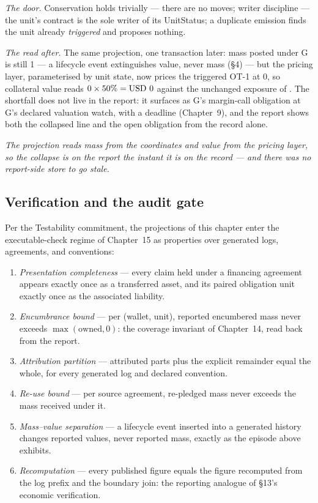 \emph{The door.} Conservation holds trivially --- there are no moves; writer
discipline --- the unit's contract is the sole writer of its UnitStatus; a
duplicate emission finds the unit already \emph{triggered} and proposes
nothing.

\emph{The read after.} The same projection, one transaction later: mass posted
under G is still 1 --- a lifecycle event extinguishes value, never mass
(\S 4) --- but the pricing layer, parameterised by unit state, now prices the
triggered OT-1 at 0, so collateral value reads $0 \times 50\% = \mbox{USD~0}$
against the unchanged exposure of . The shortfall does not live
in the report: it surfaces as G's margin-call obligation at G's declared
valuation watch, with a deadline (Chapter~9), and the report shows both the
collapsed line and the open obligation from the record alone.

\emph{The projection reads mass from the coordinates and value from the pricing
layer, so the collapse is on the report the instant it is on the record --- and
there was no report-side store to go stale.}

\subsection{Verification and the audit gate}

Per the Testability commitment, the projections of this chapter enter the
executable-check regime of Chapter~15 as properties over generated logs,
agreements, and conventions:

\begin{enumerate}[nosep]
\item \emph{Presentation completeness} --- every claim held under a financing
  agreement appears exactly once as a transferred asset, and its paired
  obligation unit exactly once as the associated liability.
\item \emph{Encumbrance bound} --- per (wallet, unit), reported encumbered mass
  never exceeds $\max(\text{owned}, 0)$: the coverage invariant of Chapter~14,
  read back from the report.
\item \emph{Attribution partition} --- attributed parts plus the explicit
  remainder equal the whole, for every generated log and declared convention.
\item \emph{Re-use bound} --- per source agreement, re-pledged mass never
  exceeds the mass received under it.
\item \emph{Mass--value separation} --- a lifecycle event inserted into a
  generated history changes reported values, never reported mass, exactly as
  the episode above exhibits.
\item \emph{Recomputation} --- every published figure equals the figure
  recomputed from the log prefix and the boundary join: the reporting analogue
  of \S 13's economic verification.
\end{enumerate}

